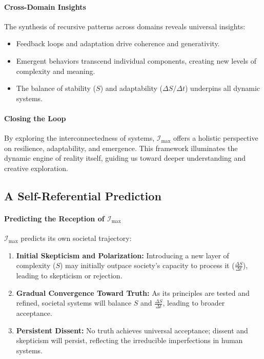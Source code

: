 \documentclass[12pt]{article}
\begin{document}
\paragraph{Cross-Domain Insights}
The synthesis of recursive patterns across domains reveals universal insights:
\begin{itemize}
    \item Feedback loops and adaptation drive coherence and generativity.
    \item Emergent behaviors transcend individual components, creating new levels of complexity and meaning.
    \item The balance of stability (\( S \)) and adaptability (\( \Delta S / \Delta t \)) underpins all dynamic systems.
\end{itemize}

\paragraph{Closing the Loop}
By exploring the interconnectedness of systems, \(\mathcal{I}_{\text{max}}\) offers a holistic perspective on resilience, adaptability, and emergence. This framework illuminates the dynamic engine of reality itself, guiding us toward deeper understanding and creative exploration.

\subsection{A Self-Referential Prediction}
\paragraph{Predicting the Reception of \(\mathcal{I}_{\text{max}}\)}
\(\mathcal{I}_{\text{max}}\) predicts its own societal trajectory:
\begin{enumerate}
    \item \textbf{Initial Skepticism and Polarization:} Introducing a new layer of complexity (\(S\)) may initially outpace society’s capacity to process it (\(\frac{\Delta S}{\Delta t}\)), leading to skepticism or rejection.
    \item \textbf{Gradual Convergence Toward Truth:} As its principles are tested and refined, societal systems will balance \(S\) and \(\frac{\Delta S}{\Delta t}\), leading to broader acceptance.
    \item \textbf{Persistent Dissent:} No truth achieves universal acceptance; dissent and skepticism will persist, reflecting the irreducible imperfections in human systems.
\end{enumerate}
\end{document}

